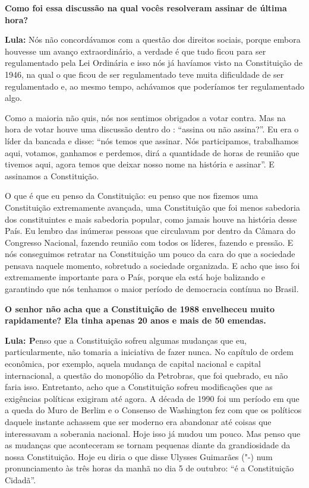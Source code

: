 \textbf{Como foi essa discussão na qual vocês resolveram assinar de
última hora? }

\textbf{Lula:} Nós não concordávamos com a questão dos direitos sociais,
porque embora houvesse um avanço extraordinário, a verdade é que tudo
ficou para ser regulamentado pela Lei Ordinária e isso nós já havíamos
visto na Constituição de 1946, na qual o que ficou de ser regulamentado
teve muita dificuldade de ser regulamentado e, ao mesmo tempo, achávamos
que poderíamos ter regulamentado algo.

Como a maioria não quis, nós nos sentimos obrigados a votar contra. Mas
na hora de votar houve uma discussão dentro do : ``assina ou não
assina?''. Eu era o líder da bancada e disse: ``nós temos que assinar.
Nós participamos, trabalhamos aqui, votamos, ganhamos e perdemos, dirá a
quantidade de horas de reunião que tivemos aqui, agora temos que deixar
nosso nome na história e assinar''. E assinamos a Constituição.

O que é que eu penso da Constituição: eu penso que nos fizemos uma
Constituição extremamente avançada, uma Constituição que foi menos
sabedoria dos constituintes e mais sabedoria popular, como jamais houve
na história desse País. Eu lembro das inúmeras pessoas que circulavam
por dentro da Câmara do Congresso Nacional, fazendo reunião com todos os
líderes, fazendo e pressão. E nós conseguimos retratar na Constituição
um pouco da cara do que a sociedade pensava naquele momento, sobretudo a
sociedade organizada. E acho que isso foi extremamente importante para o
País, porque ela está hoje balizando e garantindo que nós tenhamos o
maior período de democracia contínua no Brasil.

\textbf{O senhor não acha que a Constituição de 1988 envelheceu muito
rapidamente? Ela tinha apenas 20 anos e mais de 50 emendas.}

\textbf{Lula: P}enso que a Constituição sofreu algumas mudanças que eu,
particularmente, não tomaria a iniciativa de fazer nunca. No capítulo de
ordem econômica, por exemplo, aquela mudança de capital nacional e
capital internacional, a questão do monopólio da Petrobras, que foi
quebrado, eu não faria isso. Entretanto, acho que a Constituição sofreu
modificações que as exigências políticas exigiram até agora. A década de
1990 foi um período em que a queda do Muro de Berlim e o Consenso de
Washington fez com que os políticos daquele instante achassem que ser
moderno era abandonar até coisas que interessavam a soberania nacional.
Hoje isso já mudou um pouco. Mas penso que as mudanças que aconteceram
se tornam pequenas diante da grandiosidade da nossa Constituição. Hoje
eu diria o que disse Ulysses Guimarães ("-) num pronunciamento às
três horas da manhã no dia 5 de outubro: ``é a Constituição Cidadã''.

